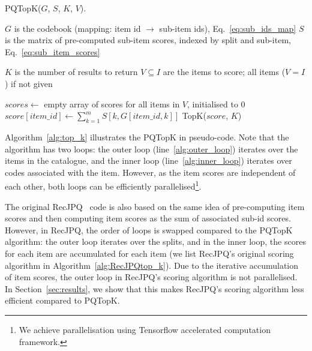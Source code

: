 \documentclass[sigconf,natbib=true, review=False]{acmart} %
\newcommand{\pageenlarge}[1]{\marginnote{#1}\enlargethispage{#1\baselineskip}}
\newcommand{\scrc}[1]{\textcolor[HTML]{000000}{#1}}
\begin{document}
\begin{algorithm}[tb]
\small
\caption{PQTopK($G$, $S$, $K$, $V$).}\label{alg:top_k}
\begin{algorithmic}[1]
   \Require $G$ is the codebook (mapping: item id $\rightarrow$ sub-item ids), Eq.~\eqref{eq:sub_ids_map}
   \Require $S$ is the matrix of pre-computed sub-item scores, indexed by split and sub-item, Eq.~\eqref{eq:sub_item_scores}

   \Require $K$ is the number of results to return
   \Require $V \subseteq I$ are the items to score; all items ($V = I$)  if not given 
   
   \State $scores \gets$ empty array of scores for all items in $V$, initialised to 0
    \label{alg:outer_loop} 
        \State $score[item\_id] \gets \sum_{k=1}^{m} S[k,G[item\_id,k]] \label{alg:inner_loop} $ 
   \EndFor
   \State \Return TopK($score$, $K$)  
\end{algorithmic}
\end{algorithm}

Algorithm~\ref{alg:top_k} illustrates the PQTopK in pseudo-code. Note that the algorithm has two loops: the outer loop (line~\ref{alg:outer_loop}) iterates over the items in the catalogue, and the inner loop (line~\ref{alg:inner_loop}) iterates over codes associated with the item. However, as the item scores are independent of each other, both loops can be efficiently parallelised\footnote{\scrc{We achieve parallelisation using Tensorflow accelerated computation framework.}}. 

 The original RecJPQ~\cite{petrovRecJPQTrainingLargeCatalogue2024} code is also based on the same idea of pre-computing item scores and then computing item scores as the sum of associated sub-id scores. However, in RecJPQ, the order of loops is swapped compared to the PQTopK algorithm: the outer loop iterates over the splits, and in the inner loop, the scores for each item are accumulated \scrc{for each item} (\scrc{we list RecJPQ's original scoring algorithm in  Algorithm~\ref{alg:RecJPQtop_k}}). Due to the \scrc{iterative accumulation of item scores}, the outer loop in RecJPQ's scoring algorithm is not parallelised. \scrc{In Section~\ref{sec:results}, we show} that this makes RecJPQ's scoring algorithm less efficient compared to PQTopK. 
\end{document}
